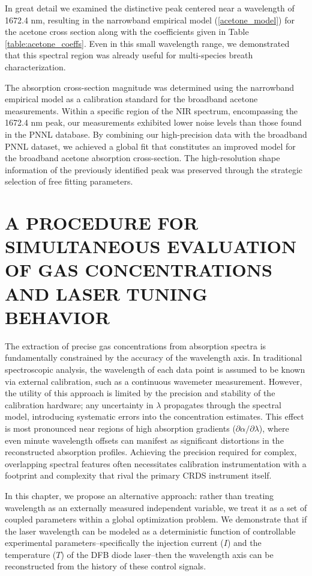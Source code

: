 \documentclass[8pt,a4paper]{report}
\begin{document}
	In great detail we examined the distinctive peak centered near a wavelength of 1672.4 nm, resulting in the narrowband empirical model (\ref{acetone_model}) for the acetone cross section along with the coefficients given in Table \ref{table:acetone_coeffs}. Even in this small wavelength range, we demonstrated that this spectral region was already useful for multi-species breath characterization.
	
	The absorption cross-section magnitude was determined using the narrowband empirical model as a calibration standard for the broadband acetone measurements. Within a specific region of the NIR spectrum, encompassing the 1672.4 nm peak, our measurements exhibited lower noise levels than those found in the PNNL database. By combining our high-precision data with the broadband PNNL dataset, we achieved a global fit that constitutes an improved model for the broadband acetone absorption cross-section. The high-resolution shape information of the previously identified peak was preserved through the strategic selection of free fitting parameters.
	
	
	\chapter{A PROCEDURE FOR SIMULTANEOUS EVALUATION OF GAS CONCENTRATIONS AND LASER TUNING BEHAVIOR} \label{chap:det}
	The extraction of precise gas concentrations from absorption spectra is fundamentally constrained by the accuracy of the wavelength axis. In traditional spectroscopic analysis, the wavelength of each data point is assumed to be known via external calibration, such as a continuous wavemeter measurement. However, the utility of this approach is limited by the precision and stability of the calibration hardware; any uncertainty in $\lambda$ propagates through the spectral model, introducing systematic errors into the concentration estimates. This effect is most pronounced near regions of high absorption gradients ($\partial\alpha/\partial\lambda$), where even minute wavelength offsets can manifest as significant distortions in the reconstructed absorption profiles. Achieving the precision required for complex, overlapping spectral features often necessitates calibration instrumentation with a footprint and complexity that rival the primary CRDS instrument itself.
	
	In this chapter, we propose an alternative approach: rather than treating wavelength as an externally measured independent variable, we treat it as a set of coupled parameters within a global optimization problem. We demonstrate that if the laser wavelength can be modeled as a deterministic function of controllable experimental parameters--specifically the injection current ($I$) and the temperature ($T$) of the DFB diode laser--then the wavelength axis can be reconstructed from the history of these control signals.
	
\end{document}
